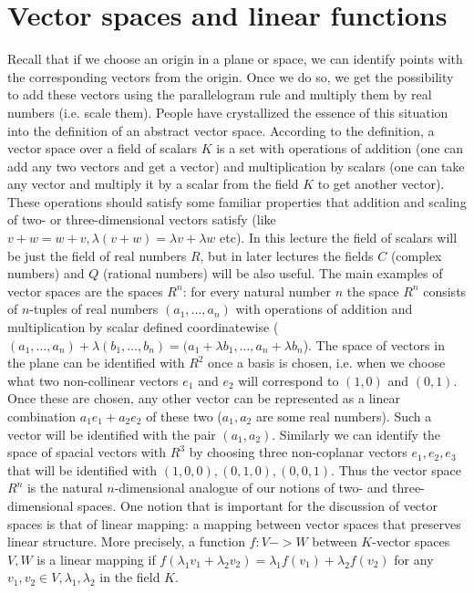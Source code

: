 \section{Vector spaces and linear functions}
Recall that if we choose an origin in a plane or space, we can identify points with the corresponding vectors from the origin. Once we do so, we get the possibility to add these vectors using the parallelogram rule and multiply them by real numbers (i.e. scale them). People have crystallized the essence of this situation into the definition of an abstract vector space.
According to the definition, a vector space over a field of scalars $K$ is a set with operations of addition (one can add any two vectors and get a vector) and multiplication by scalars (one can take any vector and multiply it by a scalar from the field $K$ to get another vector). These operations should satisfy some familiar properties that addition and scaling of two- or three-dimensional vectors satisfy (like $v+w=w+v, \lambda(v+w)=\lambda v+\lambda w$ etc).
In this lecture the field of scalars will be just the field of real numbers $R$, but in later lectures the fields $C$ (complex numbers) and $Q$ (rational numbers) will be also useful.
The main examples of vector spaces are the spaces $R^n$: for every natural number $n$ the space $R^n$ consists of $n$-tuples of real numbers $(a_1,...,a_n)$ with operations of addition and multiplication by scalar defined coordinatewise ($(a_1,\ldots,a_n)+\lambda(b_1,\ldots,b_n)=(a_1+\lambda b_1,\ldots,a_n+\lambda b_n$).
The space of vectors in the plane can be identified with $R^2$ once a basis is chosen, i.e. when we choose what two non-collinear vectors $e_1$ and $e_2$ will correspond to $(1,0)$ and $(0,1)$. Once these are chosen, any other vector can be represented as a linear combination $a_1 e_1+ a_2 e_2$ of these two ($a_1, a_2$ are some real numbers). Such a vector will be identified with the pair $(a_1,a_2)$. Similarly we can identify the space of spacial vectors with $R^3$ by choosing three non-coplanar vectors $e_1,e_2,e_3$ that will be identified with $(1,0,0),(0,1,0),(0,0,1)$.
Thus the vector space $R^n$ is the natural $n$-dimensional analogue of our notions of two- and three-dimensional spaces.
One notion that is important for the discussion of vector spaces is that of linear mapping: a mapping between vector spaces that preserves linear structure. More precisely, a function $f:V->W$ between $K$-vector spaces $V,W$ is a linear mapping if $f(\lambda_1 v_1 + \lambda_2 v_2)=\lambda_1 f(v_1) + \lambda_2 f(v_2)$ for any $v_1,v_2 \in V, \lambda_1, \lambda_2$ in the field $K$.
